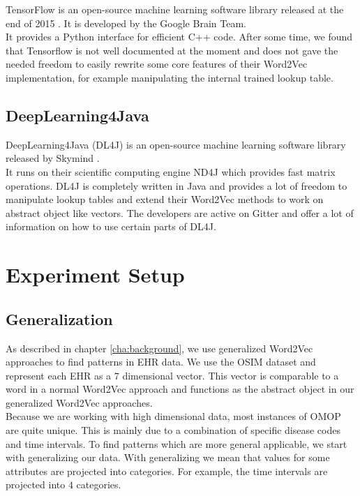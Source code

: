 TensorFlow is an open-source machine learning software library released at the end of 2015 \cite{tensorflow:article}. It is developed by the Google Brain Team. \\
It provides a Python interface for efficient C++ code. After some time, we found that Tensorflow is not well documented at the moment and does not gave the needed freedom to easily rewrite some core features of their Word2Vec implementation, for example manipulating the internal trained lookup table.


\subsection{DeepLearning4Java}

DeepLearning4Java (DL4J) is an open-source machine learning software library released by Skymind \cite{dl4j:article}. \\
It runs on their scientific computing engine ND4J which provides fast matrix operations. DL4J is completely written in Java and provides a lot of freedom to manipulate lookup tables and extend their Word2Vec methods to work on abstract object like vectors. The developers are active on Gitter and offer a lot of information on how to use certain parts of DL4J. 


\section{Experiment Setup}

\subsection{Generalization}

As described in chapter \ref{cha:background}, we use generalized Word2Vec approaches to find patterns in EHR data. We use the OSIM dataset and represent each EHR as a $7$ dimensional vector. This vector is comparable to a word in a normal Word2Vec approach and functions as the abstract object in our generalized Word2Vec approaches. \\

Because we are working with high dimensional data, most instances of OMOP are quite unique. This is mainly due to a combination of specific disease codes and time intervals. To find patterns which are more general applicable, we start with generalizing our data. With generalizing we mean that values for some attributes are projected into categories. For example, the time intervals are projected into $4$ categories. \\


